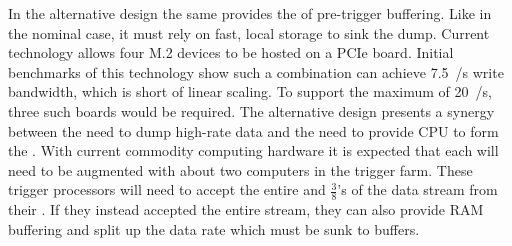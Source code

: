 In the alternative design the same  provides the
\snbpretime of pre-trigger  buffering. 
Like in the nominal case, it must rely on fast, local 
storage to sink the dump. 
Current  technology allows four M.2  devices to
be hosted on a PCIe board. 
Initial benchmarks of this technology show such a combination can
achieve \SI{7.5}{\GB/\s} write bandwidth, which is short of linear
scaling. 
To support the maximum of \SI{20}{\GB/\s}, three such boards would be
required.
The alternative design presents a synergy between the need to dump
high-rate data and the need to provide CPU to form the
. 
With current commodity computing hardware it is expected that each
 will need to be augmented with about two computers in the trigger
farm. 
These trigger processors will need to accept the entire \dual and
$\frac{3}{8}$'s of the \single data stream from their . 
If they instead accepted the entire stream, they can also provide
RAM buffering and split up the data rate which must be sunk to
 buffers.


